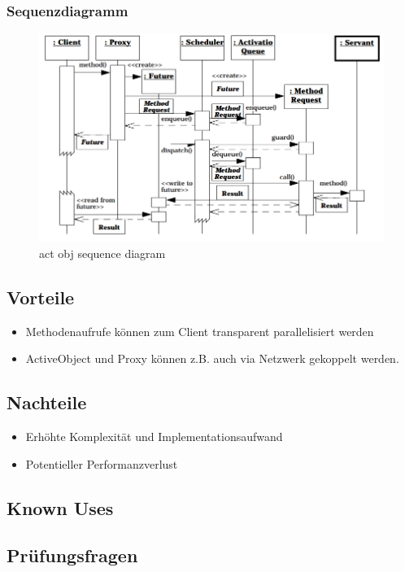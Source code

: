 \subsubsection*{Sequenzdiagramm}

\begin{figure}[H]
	\centering
	\includegraphics[width=\textwidth]{content/posa2/active-object/images/act-obj_sequence-diagram.png}
	\caption{act obj sequence diagram}
\end{figure}




\subsection{Vorteile}


\begin{itemize}
	\item Methodenaufrufe können zum Client transparent parallelisiert werden
	\item ActiveObject und Proxy können z.B. auch via Netzwerk gekoppelt werden.
\end{itemize}

\subsection{Nachteile}


\begin{itemize}
	\item Erhöhte Komplexität und Implementationsaufwand
	\item Potentieller Performanzverlust
\end{itemize}

\subsection{Known Uses}


\subsection{Prüfungsfragen}


